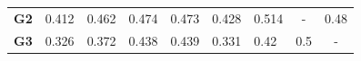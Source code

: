 \begin{table}[t]
\begin{tabular}{@{}lllllllll@{}}
\multicolumn{1}{l|}{\textbf{G2}} & \multicolumn{1}{l|}{\cellcolor[HTML]{EFEFEF}0.412} & \multicolumn{1}{l|}{\cellcolor[HTML]{EFEFEF}0.462} & \multicolumn{1}{l|}{\cellcolor[HTML]{EFEFEF}0.474} & \multicolumn{1}{l|}{\cellcolor[HTML]{EFEFEF}0.473} & \multicolumn{1}{l|}{\cellcolor[HTML]{EFEFEF}0.428} & \multicolumn{1}{l|}{\cellcolor[HTML]{EFEFEF}0.514} & \multicolumn{1}{c|}{\cellcolor[HTML]{EFEFEF}-} & \multicolumn{1}{l|}{\cellcolor[HTML]{EFEFEF}0.48} \\ \cmidrule(l){2-9}
\multicolumn{1}{l|}{\textbf{G3}} & \multicolumn{1}{l|}{0.326} & \multicolumn{1}{l|}{0.372} & \multicolumn{1}{l|}{0.438} & \multicolumn{1}{l|}{0.439} & \multicolumn{1}{l|}{0.331} & \multicolumn{1}{l|}{0.42} & \multicolumn{1}{l|}{0.5} & \multicolumn{1}{c|}{-} \\ \cmidrule(l){2-9}
\end{tabular}
\end{table}



